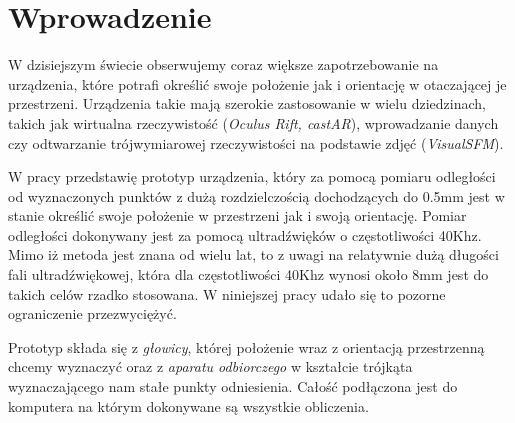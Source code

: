 
\chapter*{Wprowadzenie}

W dzisiejszym świecie obserwujemy coraz większe zapotrzebowanie na urządzenia,
które potrafi określić swoje położenie jak i orientację w otaczającej je przestrzeni.
Urządzenia takie mają szerokie zastosowanie w wielu dziedzinach, takich jak
wirtualna rzeczywistość (\textit{Oculus Rift, castAR}), wprowadzanie danych czy 
odtwarzanie trójwymiarowej rzeczywistości na podstawie zdjęć (\textit{VisualSFM}).


W pracy przedstawię prototyp urządzenia, który za pomocą pomiaru odległości od wyznaczonych punktów
z dużą rozdzielczością dochodzących do 0.5mm jest w stanie określić swoje położenie
w przestrzeni jak i swoją orientację. 
Pomiar odległości dokonywany jest za pomocą ultradźwięków o częstotliwości 40Khz.  
Mimo iż metoda jest znana od wielu lat, to z uwagi na relatywnie dużą długości fali ultradźwiękowej,
która dla częstotliwości 40Khz wynosi około 8mm jest do takich celów rzadko stosowana.
W niniejszej pracy udało się to pozorne ograniczenie przezwyciężyć.

Prototyp składa się z \textit{głowicy}, której położenie wraz z orientacją przestrzenną chcemy wyznaczyć
oraz z \textit{aparatu odbiorczego} w kształcie trójkąta wyznaczającego nam stałe punkty odniesienia.
Całość podłączona jest do komputera na którym dokonywane są wszystkie obliczenia.



